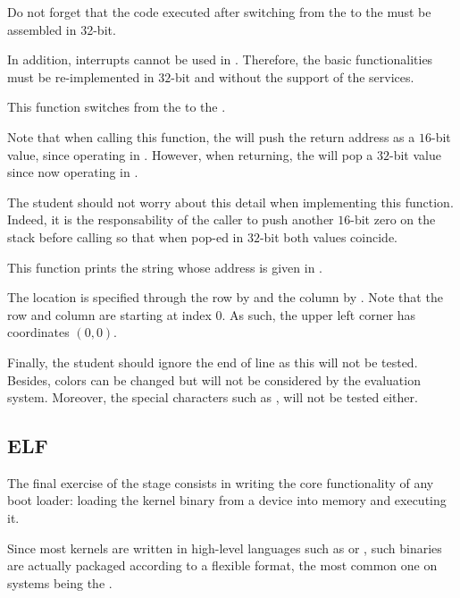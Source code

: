 Do not forget that the code executed after switching from the 
to the  must be assembled in 32-bit.

In addition,  interrupts cannot be used in .
Therefore, the basic functionalities must be re-implemented in $32$-bit and
without the support of the  services.

{
  This function switches from the  to the .

  \-

  Note that when calling this function, the  will push the return
  address as a $16$-bit value, since operating in . However,
  when returning, the  will pop a $32$-bit value since now operating
  in .

  \-

  The student should not worry about this detail when implementing this
  function. Indeed, it is the responsability of the caller to push another
  $16$-bit zero on the stack before calling so that when pop-ed in $32$-bit
  both values coincide.
}

{
  This function prints the string whose address is given in .

  \-

  The location is specified through the row by  and the
  column by . Note that the row and column are starting at
  index 0. As such, the upper left corner has coordinates $(0,0)$.

  \-

  Finally, the student should ignore the end of line as this will not be
  tested. Besides, colors can be changed but will not be considered by
  the evaluation system. Moreover, the special characters such as ,
   \etc{} will not be tested either.
}

\subsection{ELF}

The final exercise of the  stage consists in writing the core
functionality of any boot loader: loading the kernel binary from a device
into memory and executing it.

Since most kernels are written in high-level languages such as  or
, such binaries are actually packaged according to a flexible format,
the most common one on  systems being the .

